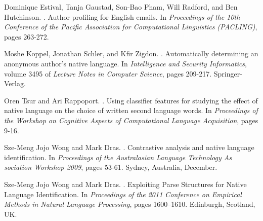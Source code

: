 \documentclass[11pt]{article}
\begin{document}
\begin{thebibliography}{}

Dominique Estival, Tanja Gaustad, Son-Bao Pham, Will Radford, and Ben Hutchinson.
.
\newblock Author profiling for English emails. In {\em Proceedings of the 10th Conference of the Pacific Association for Computational Linguistics (PACLING)}, pages 263-272.

Moshe Koppel, Jonathan Schler, and Kfir Zigdon.
.
\newblock Automatically determining an anonymous author’s native language. In {\em Intelligence and Security Informatics}, volume 3495 of {\em Lecture Notes in Computer Science}, pages 209-217.
\newblock Springer-Verlag.

Oren Tsur and Ari Rappoport.
.
\newblock Using classifier features for studying the effect of native language on the choice of written second language words. In {\em Proceedings of the Workshop on Cognitive Aspects of Computational Language Acquisition}, pages 9-16.

Sze-Meng Jojo Wong and Mark Dras.
.
\newblock Contrastive analysis and native language identification. In {\em Proceedings of the Australasian Language Technology As sociation Workshop 2009}, pages 53-61.
\newblock Sydney, Australia, December.

Sze-Meng Jojo Wong and Mark Dras.
.
\newblock Exploiting Parse Structures for Native Language Identification. In {\em Proceedings of the 2011 Conference on Empirical Methods in Natural Language Processing}, pages 1600–1610.
\newblock Edinburgh, Scotland, UK.

\end{thebibliography}
\end{document}
